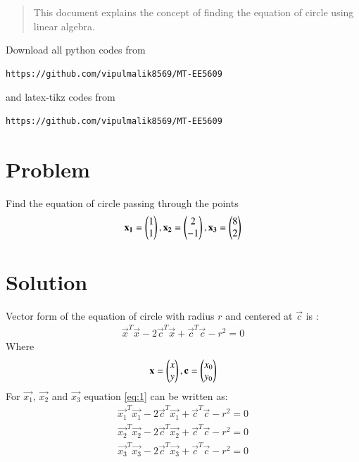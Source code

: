 \documentclass[journal,12pt,twocolumn]{IEEEtran}
\begin{document}
\date{\today}

\maketitle
\newpage
\bigskip
\renewcommand{\thefigure}{\theenumi}
\renewcommand{\thetable}{\theenumi}

\begin{abstract}
This document explains the concept of finding the equation of circle using linear algebra.
\end{abstract}
Download all python codes from 
\begin{lstlisting}
https://github.com/vipulmalik8569/MT-EE5609
\end{lstlisting}
and latex-tikz codes from 
\begin{lstlisting}
https://github.com/vipulmalik8569/MT-EE5609
\end{lstlisting}
\section{\textbf{Problem}}
Find the equation of circle passing through the points
\begin{align}
    \mathbf{x_1}=\begin{pmatrix}1\\1\end{pmatrix}, \mathbf{x_2}=\begin{pmatrix}2\\-1\end{pmatrix}, \mathbf{x_3}=\begin{pmatrix}8\\2\end{pmatrix}\label{eq:0}
\end{align}
\section{\textbf{Solution}}
Vector form of the equation of circle with radius $r$ and centered at $\vec{c}$ is :
\begin{align}
\vec{x}^T\vec{x}-2\vec{c}^T\vec{x}+\vec{c}^T\vec{c}-r^2=0\label{eq:1}
\end{align}
Where
\begin{align}
\mathbf{x}=\begin{pmatrix}x\\y\end{pmatrix}, \mathbf{c}=\begin{pmatrix}x_0\\y_0\end{pmatrix} 
\end{align}
For $\vec{x_1}$, $\vec{x_2}$ and $\vec{x_3}$ equation \eqref{eq:1} can be written as:
\begin{align}
\vec{x_1}^T\vec{x_1}-2\vec{c}^T\vec{x_1}+\vec{c}^T\vec{c}-r^2=0\\
\vec{x_2}^T\vec{x_2}-2\vec{c}^T\vec{x_2}+\vec{c}^T\vec{c}-r^2=0\\
\vec{x_3}^T\vec{x_3}-2\vec{c}^T\vec{x_3}+\vec{c}^T\vec{c}-r^2=0
\end{align}
\end{document}
